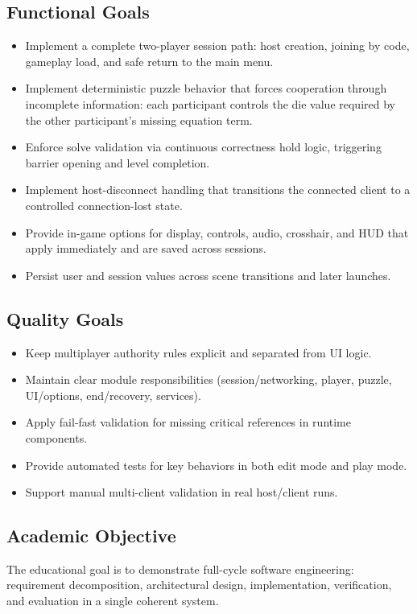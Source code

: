 \subsection*{Functional Goals}
\begin{itemize}
\item Implement a complete two-player session path: host creation, joining by code, gameplay load, and safe return to the main menu.
\item Implement deterministic puzzle behavior that forces cooperation through incomplete information: each participant controls the die value required by the other participant's missing equation term.
\item Enforce solve validation via continuous correctness hold logic, triggering barrier opening and level completion.
\item Implement host-disconnect handling that transitions the connected client to a controlled connection-lost state.
\item Provide in-game options for display, controls, audio, crosshair, and HUD that apply immediately and are saved across sessions.
\item Persist user and session values across scene transitions and later launches.
\end{itemize}

\subsection*{Quality Goals}
\begin{itemize}
\item Keep multiplayer authority rules explicit and separated from UI logic.
\item Maintain clear module responsibilities (session/networking, player, puzzle, UI/options, end/recovery, services).
\item Apply fail-fast validation for missing critical references in runtime components.
\item Provide automated tests for key behaviors in both edit mode and play mode.
\item Support manual multi-client validation in real host/client runs.
\end{itemize}

\subsection*{Academic Objective}
The educational goal is to demonstrate full-cycle software engineering: requirement decomposition, architectural design, implementation, verification, and evaluation in a single coherent system.


